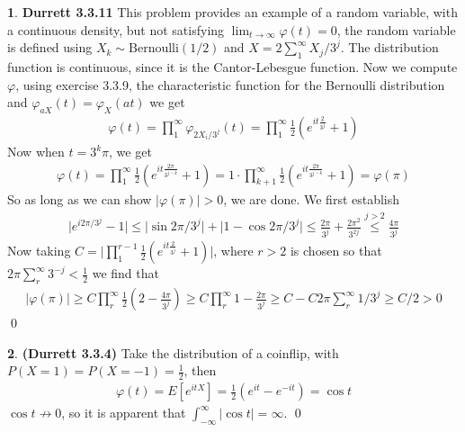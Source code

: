 \documentclass[10.5pt]{article}
\theoremstyle{definition}
\newtheorem{pb}{}
\newcommand{\abs}[1]{\lvert#1\rvert}
\begin{document}
    \begin{pb}\textbf{Durrett 3.3.11}
        This problem provides an example of a random variable, with a continuous density, but not satisfying \(\lim_{t\to\infty}\varphi(t) = 0\), the random variable is defined using \(X_k \sim \text{Bernoulli}(1/2)\) and \(X = 2\sum_1^\infty X_j/3^j\). The distribution function is continuous, since it is the Cantor-Lebesgue function. Now we compute \(\varphi\), using exercise 3.3.9, the characteristic function for the Bernoulli distribution and \(\varphi_{aX}(t)=\varphi_X(at)\) we get
        \begin{align*}
            \varphi(t) = \prod_1^\infty \varphi_{2X_i/3^j}(t) = \prod_1^\infty \frac12\left(e^{it\frac{2}{3^j}} + 1\right)
        \end{align*}
        Now when \(t = 3^k\pi\), we get
        \begin{align*}
            \varphi(t) = \prod_1^\infty \frac{1}{2}\left(e^{it\frac{2\pi}{3^{j-k}}} + 1\right) = 1\cdot\prod_{k+1}^\infty \frac{1}{2}\left(e^{it\frac{2\pi}{3^{j-k}}} + 1\right) = \varphi(\pi)
        \end{align*}
        So as long as we can show \(\abs{\varphi(\pi)} > 0\), we are done. We first establish
        \begin{align*}
            \abs{e^{i2\pi/3^j} - 1} \leq \abs{\sin2\pi/3^j} + \abs{1 - \cos2\pi/3^j} \leq \frac{2\pi}{3^j} + \frac{2\pi^2}{3^{2j}} \overset{j>2}{\leq} \frac{4\pi}{3^j}
        \end{align*}
        Now taking \(C = \abs{\prod_1^{r-1} \frac12\left(e^{it\frac{2}{3^j}} + 1\right)}\), where \(r > 2\) is chosen so that \(2\pi\sum_r^\infty3^{-j} < \frac12\) we find that
        \begin{align*}
            \abs{\varphi(\pi)} \geq C\prod_r^\infty \frac12\left(2-\frac{4\pi}{3^j}\right) \geq C\prod_r^\infty 1 - \frac{2\pi}{3^j} \geq C - C2\pi\sum_r^\infty 1/3^j \geq C/2 > 0
        \end{align*} \qed
    \end{pb}
    \begin{pb}\textbf{(Durrett 3.3.4)}
        Take the distribution of a coinflip, with \(P(X=1)=P(X=-1)=\frac12\), then
        \begin{align*}
            \varphi(t) = E[e^{itX}] = \frac{1}{2}(e^{it} - e^{-it}) = \cos t
        \end{align*}
        \(\cos t \not \to 0\), so it is apparent that \(\int_{-\infty}^\infty \abs{\cos t} = \infty\). \qed
    \end{pb}
\end{document}
